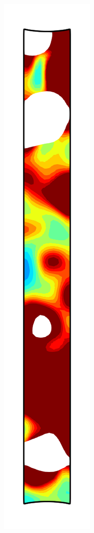 \begin{figure}[!htb]
\begin{subfigure}{0.08\textwidth}
  \end{subfigure}
  \begin{subfigure}{0.08\textwidth}
    \centering
    \includegraphics[width=\textwidth]{Chapter5/figures/spallation/ep_10}

\end{subfigure}
\end{figure}
